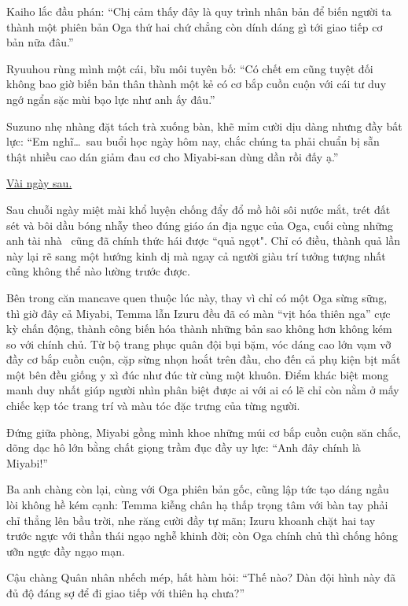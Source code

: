 \documentclass[../main.tex]{subfiles}
\begin{document}
Kaiho lắc đầu phán: ``Chị cảm thấy đây là quy trình nhân bản để biến người ta thành một phiên bản Oga thứ hai chứ chẳng còn dính dáng gì tới giao tiếp cơ bản nữa đâu.''

Ryuuhou rùng mình một cái, bĩu môi tuyên bố: ``Có chết em cũng tuyệt đối không bao giờ biến bản thân thành một kẻ có cơ bắp cuồn cuộn với cái tư duy ngớ ngẩn sặc mùi bạo lực như anh ấy đâu.''

Suzuno nhẹ nhàng đặt tách trà xuống bàn, khẽ mỉm cười dịu dàng nhưng đầy bất lực: ``Em nghĩ\dots\ sau buổi học ngày hôm nay, chắc chúng ta phải chuẩn bị sẵn thật nhiều cao dán giảm đau cơ cho Miyabi-san dùng dần rồi đấy ạ.''

\begin{center}
    \uline{Vài ngày sau.}
\end{center}

Sau chuỗi ngày miệt mài khổ luyện chống đẩy đổ mồ hôi sôi nước mắt, trét đất sét và bôi dầu bóng nhẫy theo đúng giáo án địa ngục của Oga, cuối cùng những anh tài nhà \hls\ cũng đã chính thức hái được ``quả ngọt". Chỉ có điều, thành quả lần này lại rẽ sang một hướng kinh dị mà ngay cả người giàu trí tưởng tượng nhất cũng không thể nào lường trước được.

Bên trong căn mancave quen thuộc lúc này, thay vì chỉ có một Oga sừng sững, thì giờ đây cả Miyabi, Temma lẫn Izuru đều đã có màn ``vịt hóa thiên nga'' cực kỳ chấn động, thành công biến hóa thành những bản sao không hơn không kém so với chính chủ. Từ bộ trang phục quân đội bụi bặm, vóc dáng cao lớn vạm vỡ đầy cơ bắp cuồn cuộn, cặp sừng nhọn hoắt trên đầu, cho đến cả phụ kiện bịt mắt một bên đều giống y xì đúc như đúc từ cùng một khuôn. Điểm khác biệt mong manh duy nhất giúp người nhìn phân biệt được ai với ai có lẽ chỉ còn nằm ở mấy chiếc kẹp tóc trang trí và màu tóc đặc trưng của từng người.


Đứng giữa phòng, Miyabi gồng mình khoe những múi cơ bắp cuồn cuộn săn chắc, dõng dạc hô lớn bằng chất giọng trầm đục đầy uy lực: ``Anh đây chính là Miyabi!''

Ba anh chàng còn lại, cùng với Oga phiên bản gốc, cũng lập tức tạo dáng ngầu lòi không hề kém cạnh: Temma kiễng chân hạ thấp trọng tâm với bàn tay phải chỉ thẳng lên bầu trời, nhe răng cười đầy tự mãn; Izuru khoanh chặt hai tay trước ngực với thần thái ngạo nghễ khinh đời; còn Oga chính chủ thì chống hông ưỡn ngực đầy ngạo mạn.

Cậu chàng Quân nhân nhếch mép, hất hàm hỏi: ``Thế nào? Dàn đội hình này đã đủ độ đáng sợ để đi giao tiếp với thiên hạ chưa?''
\end{document}
